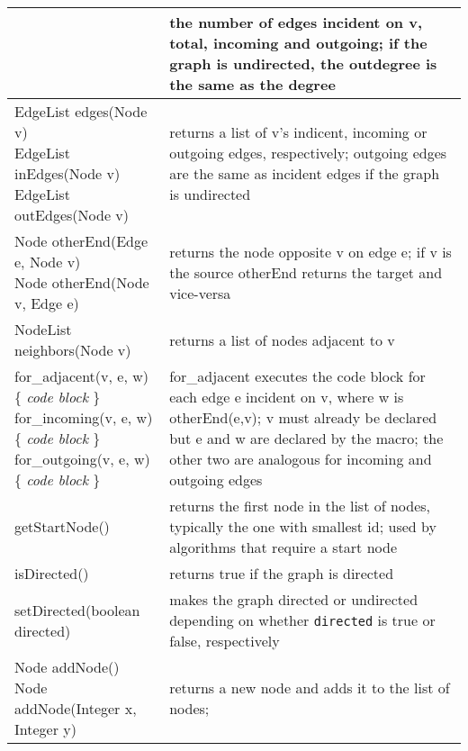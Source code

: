 \begin{table}
\begin{tabular}{| m{} | m{} |}
{    }
    &
    the number of edges incident on \textsf{v}, total, incoming and outgoing;
    if the graph is undirected, the outdegree is the same as the degree
    \\ \hline
    \shortstack[l]{
      \textsf{EdgeList edges(Node v)}\\
      \textsf{EdgeList inEdges(Node v)}\\
      \textsf{EdgeList outEdges(Node v)}
    }
    &
    returns a list of \textsf{v}'s
    indicent, incoming or outgoing edges, respectively;
    outgoing edges are the same as incident edges if the graph is undirected 
    \\ \hline
    \shortstack[l]{
      \textsf{Node otherEnd(Edge e, Node v)}\\
      \textsf{Node otherEnd(Node v, Edge e)}
    }
    &
    returns the node opposite \textsf{v} on edge \textsf{e};
    if \textsf{v} is the source \textsf{otherEnd} returns the target and
    vice-versa
    \\ \hline
    \textsf{NodeList neighbors(Node v)}
    &
    returns a list of nodes adjacent to \textsf{v}
    \\ \hline
    \shortstack[l]{
      \textsf{for\_adjacent(v, e, w) \{ \emph{code block} \}} \\
      \textsf{for\_incoming(v, e, w) \{ \emph{code block} \}} \\ 
      \textsf{for\_outgoing(v, e, w) \{ \emph{code block} \}}
    }
    &
    \textsf{for\_adjacent} executes the code block for each edge \textsf{e}
    incident on \textsf{v}, where \textsf{w} is \textsf{otherEnd(e,v)};
    \textsf{v} must already be declared but \textsf{e} and \textsf{w} are
    declared by the macro;
    the other two are analogous for incoming and outgoing edges 
    \\ \hline
    \textsf{getStartNode()}
    &
    returns the first node in the list of nodes, typically the one with smallest id;
    used by algorithms that require a start node
    \\ \hline
    \textsf{isDirected()}
    &
    returns true if the graph is directed
    \\ \hline
    \textsf{setDirected(boolean directed)}
    &
    makes the graph directed or undirected depending on whether \texttt{directed}
    is true or false, respectively
    \\ \hline
    \shortstack[l]{
      \textsf{Node addNode()}\\
      \textsf{Node addNode(Integer x, Integer y)}
    }
    &
    returns a new node and adds it to the list of nodes;

\end{tabular}
\end{table}
